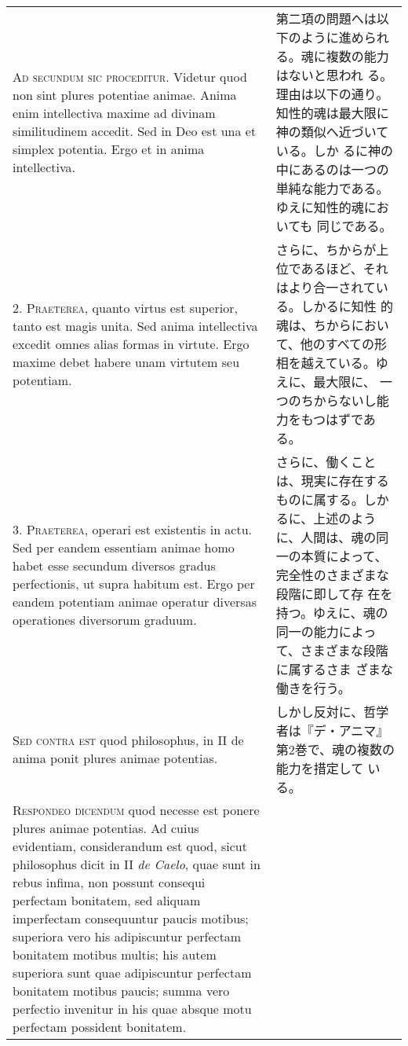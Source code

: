 \documentclass[paper=a4paper,fontsize=10pt,jafontsize=9pt,titlepage]{jlreq}
\begin{document}
\begin{longtable}{p{21em}p{21em}}
 {\scshape Ad secundum sic proceditur}. Videtur quod non sint plures
 potentiae animae. Anima enim intellectiva maxime ad divinam
 similitudinem accedit. Sed in Deo est una et simplex potentia. Ergo
 et in anima intellectiva.

 &

 第二項の問題へは以下のように進められる。魂に複数の能力はないと思われ
 る。理由は以下の通り。知性的魂は最大限に神の類似へ近づいている。しか
 るに神の中にあるのは一つの単純な能力である。ゆえに知性的魂においても
 同じである。

\\

2. {\scshape Praeterea}, quanto virtus est superior, tanto est magis
unita. Sed anima intellectiva excedit omnes alias formas in
virtute. Ergo maxime debet habere unam virtutem seu potentiam.

 &

さらに、ちからが上位であるほど、それはより合一されている。しかるに知性
的魂は、ちからにおいて、他のすべての形相を越えている。ゆえに、最大限に、
一つのちからないし能力をもつはずである。

\\


3. {\scshape Praeterea}, operari est existentis in actu. Sed per
eandem essentiam animae homo habet esse secundum diversos gradus
perfectionis, ut supra habitum est. Ergo per eandem potentiam animae
operatur diversas operationes diversorum graduum.

 &

 さらに、働くことは、現実に存在するものに属する。しかるに、上述のよう
 に、人間は、魂の同一の本質によって、完全性のさまざまな段階に即して存
 在を持つ。ゆえに、魂の同一の能力によって、さまざまな段階に属するさま
 ざまな働きを行う。


\\


 {\scshape Sed contra est} quod philosophus, in II de anima ponit
 plures animae potentias.

 &

しかし反対に、哲学者は『デ・アニマ』第2巻で、魂の複数の能力を措定して
いる。

\\


 {\scshape Respondeo dicendum} quod necesse est ponere plures animae
 potentias. Ad cuius evidentiam, considerandum est quod, sicut
 philosophus dicit in II {\itshape de Caelo}, quae sunt in rebus
 infima, non possunt consequi perfectam bonitatem, sed aliquam
 imperfectam consequuntur paucis motibus; superiora vero his
 adipiscuntur perfectam bonitatem motibus multis; his autem superiora
 sunt quae adipiscuntur perfectam bonitatem motibus paucis; summa vero
 perfectio invenitur in his quae absque motu perfectam possident
 bonitatem.



\end{longtable}
\end{document}
